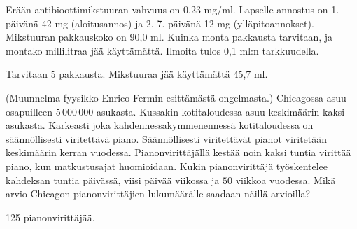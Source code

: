 \begin{tehtavasivu}
\begin{tehtava}
Erään antibioottimikstuuran vahvuus on 0,23 mg/ml. Lapselle annostus on 1. päivänä 42 mg (aloitusannos) 
ja 2.-7. päivänä 12 mg (ylläpitoannokset). Mikstuuran pakkauskoko on 90,0 ml. Kuinka monta pakkausta tarvitaan, 
ja montako millilitraa jää käyttämättä. Ilmoita tulos 0,1 ml:n tarkkuudella.
 \begin{vastaus}
 Tarvitaan 5 pakkausta. Mikstuuraa jää käyttämättä 45,7 ml.
 \end{vastaus}
\end{tehtava}

\begin{tehtava}
(Muunnelma fyysikko Enrico Fermin esittämästä ongelmasta.) Chicagossa asuu osapuilleen
$5\,000\,000$ asukasta. Kussakin kotitaloudessa asuu keskimäärin kaksi asukasta.
Karkeasti joka kahdennessakymmenennessä kotitaloudessa on säännöllisesti viritettävä piano.
Säännöllisesti viritettävät pianot viritetään keskimäärin kerran vuodessa.
Pianonvirittäjällä kestää noin kaksi tuntia virittää piano, kun matkustusajat huomioidaan.
Kukin pianonvirittäjä työskentelee kahdeksan tuntia päivässä, viisi päivää viikossa
ja $50$ viikkoa vuodessa. Mikä arvio Chicagon pianonvirittäjien lukumäärälle saadaan näillä
arvioilla?
\begin{vastaus}
125 pianonvirittäjää.
\end{vastaus}
\end{tehtava}

\end{tehtavasivu}
